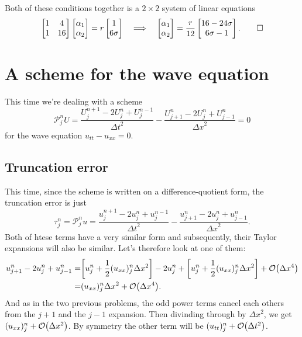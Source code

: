 \documentclass[11pt,letter, swedish, english
]{article}
\newcommand{\Dx}{\ensuremath{\Delta{x}}}
\newcommand{\Dt}{\ensuremath{\Delta{t}}}
\begin{document}
Both of these conditions together is a $2\times2$ system of linear
equations 
\begin{equation}
\begin{bmatrix}1&4\\1&16\end{bmatrix}
\begin{bmatrix}\alpha_1\\\alpha_2\end{bmatrix}
=r\begin{bmatrix}1\\6\sigma\end{bmatrix}
\quad\Longrightarrow\quad
\begin{bmatrix}\alpha_1\\\alpha_2\end{bmatrix}
=\frac{r}{12}\begin{bmatrix*}[c]
16-24\sigma\\6\sigma-1
\end{bmatrix*}.
\qed
\end{equation}


\section{A scheme for the wave equation}
This time we're dealing with a scheme
\begin{equation}\label{eq:3_start}
\mathcal{P}_j^nU=\frac{U_j^{n+1}-2U_j^{n}+U_j^{n-1}}{\Dt^2}
-\frac{U_{j+1}^{n}-2U_j^{n}+U_{j-1}^{n}}{\Dx^2}=0
\end{equation}
for the wave equation $u_{tt}-u_{xx}=0$.

\subsection{Truncation error}
This time, since the scheme is written on a difference-quotient form,
the truncation error is just
\begin{equation}
\tau_j^n=\mathcal{P}_j^nu
=\frac{u_j^{n+1}-2u_j^{n}+u_j^{n-1}}{\Dt^2}
-\frac{u_{j+1}^{n}-2u_j^{n}+u_{j-1}^{n}}{\Dx^2}.
\end{equation}
Both of htese terms have a very similar form and subsequently, their
Taylor expansions will also be similar. Let's therefore look at one of
them:
\begin{equation}
\begin{aligned}
u_{j+1}^{n}-2u_j^{n}+u_{j-1}^{n}=&
\qty[u_j^n+\frac{1}{2}(u_{xx})_j^n\Dx^2]-2u_j^n
+\qty[u_j^n+\frac{1}{2}(u_{xx})_j^n\Dx^2]+\order{\Dx^4}\\
=&(u_{xx})_j^n\Dx^2+\order{\Dx^4}.
\end{aligned}
\end{equation}
And as in the two previous problems, the odd power terms cancel each
others from the $j+1$ and the $j-1$ expansion. Then divinding through
by $\Dx^2$, we get $(u_{xx})_j^n+\order{\Dx^2}$.
By symmetry the other term will be $(u_{tt})_j^n+\order{\Dt^2}$.
\end{document}
